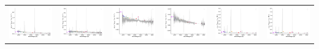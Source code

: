 \begin{center}
\begin{longtable}{l l l l l l }
    \includegraphics[width=0.3\linewidth, clip]{Figs/Figs-sdss/spec-1071-52641-0266-STRIPE82-0053-009717.pdf} & \includegraphics[width=0.3\linewidth, clip]{Figs/Figs-sdss/spec-1071-52641-0358-STRIPE82-0054-042573.pdf} & \includegraphics[width=0.3\linewidth, clip]{Figs/Figs-sdss/spec-1073-52649-0091-STRIPE82-0049-021805.pdf} & \includegraphics[width=0.3\linewidth, clip]{Figs/Figs-sdss/spec-1085-52531-0175-STRIPE82-0017-027488.pdf} & \includegraphics[width=0.3\linewidth, clip]{Figs/Figs-sdss/spec-1089-52913-0196-STRIPE82-0007-024265.pdf} & \includegraphics[width=0.3\linewidth, clip]{Figs/Figs-sdss/spec-1089-52913-0199-STRIPE82-0007-023673.pdf} \\

\end{longtable}
\end{center}
